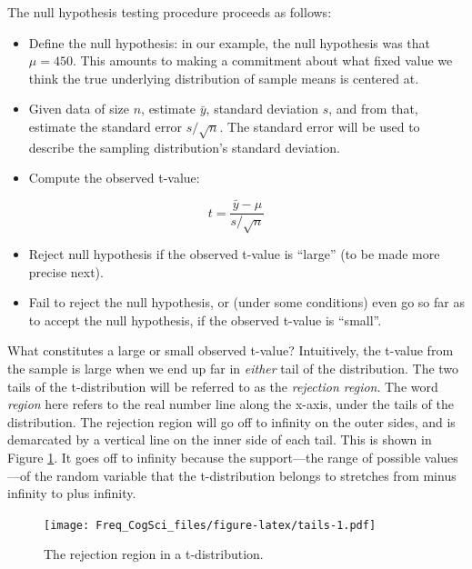 \documentclass[12pt,]{krantz}
\providecommand{\tightlist}{%
  \setlength{\itemsep}{0pt}\setlength{\parskip}{0pt}}
\begin{document}
The null hypothesis testing procedure proceeds as follows:

\begin{itemize}
\tightlist
\item
  Define the null hypothesis: in our example, the null hypothesis was that \(\mu = 450\). This amounts to making a commitment about what fixed value we think the true underlying distribution of sample means is centered at.
\item
  Given data of size \(n\), estimate \(\bar{y}\), standard deviation \(s\), and from that, estimate the standard error \(s/\sqrt{n}\). The standard error will be used to describe the sampling distribution's standard deviation.
\item
  Compute the observed t-value:
\end{itemize}

\begin{equation}
t=\frac{\bar{y}-\mu}{s/\sqrt{n}}
\end{equation}

\begin{itemize}
\tightlist
\item
  Reject null hypothesis if the observed t-value is ``large'' (to be made more precise next).
\item
  Fail to reject the null hypothesis, or (under some conditions) even go so far as to accept the null hypothesis, if the observed t-value is ``small''.
\end{itemize}

What constitutes a large or small observed t-value?
Intuitively, the t-value from the sample is large when we end up far in \emph{either} tail of the distribution. The two tails of the t-distribution will be referred to as the \emph{rejection region}. The word \emph{region} here refers to the real number line along the x-axis, under the tails of the distribution. The rejection region will go off to infinity on the outer sides, and is demarcated by a vertical line on the inner side of each tail. This is shown in Figure \ref{fig:tails}. It goes off to infinity because the support---the range of possible values---of the random variable that the t-distribution belongs to stretches from minus infinity to plus infinity.

\begin{figure}
\centering
\texttt{[image: Freq\_CogSci\_files/figure-latex/tails-1.pdf]}
\caption{\label{fig:tails}The rejection region in a t-distribution.}
\end{figure}
\end{document}
